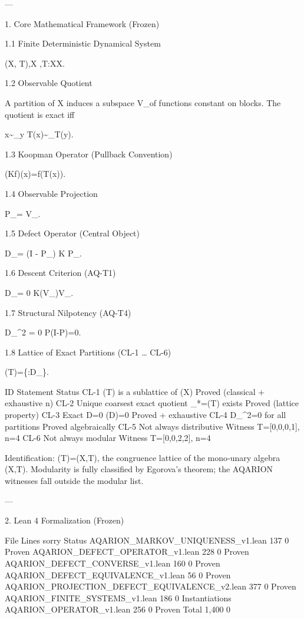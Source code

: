 {{{{{{{{{{{{{---

1. Core Mathematical Framework (Frozen)

1.1 Finite Deterministic Dynamical System

(X, T),\quad X ,\quad T:X\to X.

1.2 Observable Quotient

A partition \Pi of X induces a subspace V_\Pi of functions constant on blocks. The quotient is exact iff

x\sim_\Pi y \;\Rightarrow\; T(x)\sim_\Pi T(y).

1.3 Koopman Operator (Pullback Convention)

(Kf)(x)=f(T(x)).

1.4 Observable Projection

P_\Pi = V_\Pi.

1.5 Defect Operator (Central Object)

D_\Pi = (I - P_\Pi) K P_\Pi.

1.6 Descent Criterion (AQ-T1)

D_\Pi = 0 \;\Longleftrightarrow\; \Pi {} \;\Longleftrightarrow\; K(V_\Pi)\subseteq V_\Pi.

1.7 Structural Nilpotency (AQ-T4)

D_\Pi^2 = 0 \quad {}P(I-P)=0\text{)}.

1.8 Lattice of Exact Partitions (CL-1 … CL-6)

(T)=\{\Pi:D_\}.

ID Statement Status
CL-1 (T) is a sublattice of (X) Proved (classical + exhaustive n)
CL-2 Unique coarsest exact quotient \Pi_*=\bigwedge{}(T) exists Proved (lattice property)
CL-3 Exact \Leftrightarrow D=0 \Leftrightarrow {}(D)=0 Proved + exhaustive
CL-4 D_\Pi^2=0 for all partitions Proved algebraically
CL-5 Not always distributive Witness T=[0,0,0,1], n=4
CL-6 Not always modular Witness T=[0,0,2,2], n=4

Identification: (T)=(X,T), the congruence lattice of the mono‑unary algebra (X,T). Modularity is fully classified by Egorova’s theorem; the AQARION witnesses fall outside the modular list.

---

2. Lean 4 Formalization (Frozen)

File Lines sorry Status
AQARION_MARKOV_UNIQUENESS_v1.lean 137 0 Proven
AQARION_DEFECT_OPERATOR_v1.lean 228 0 Proven
AQARION_DEFECT_CONVERSE_v1.lean 160 0 Proven
AQARION_DEFECT_EQUIVALENCE_v1.lean 56 0 Proven
AQARION_PROJECTION_DEFECT_EQUIVALENCE_v2.lean 377 0 Proven
AQARION_FINITE_SYSTEMS_v1.lean 186 0 Instantiations
AQARION_OPERATOR_v1.lean 256 0 Proven
Total 1,400 0 

}}}}}}}}}}}}}

